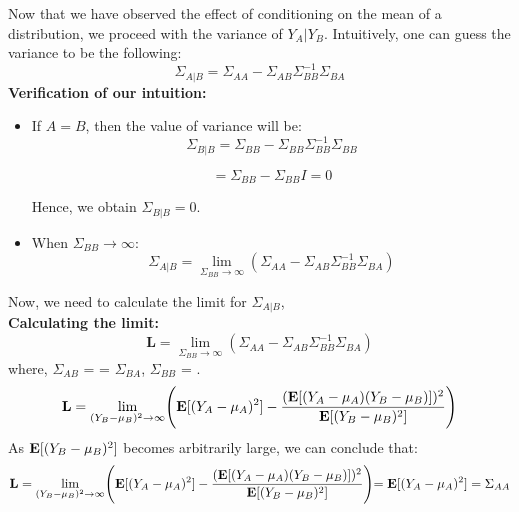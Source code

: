\documentclass[12pt]{article}
\begin{document}
\noindent
Now that we have observed the effect of conditioning on the mean of a distribution, we proceed with the variance of $Y_A|Y_B$. Intuitively, one can guess the variance to be the following:
\begin{equation}
    \Sigma_{A|B}= \Sigma_{AA}-\Sigma_{AB}\Sigma_{BB}^{-1}\Sigma_{BA}
\end{equation}
\textbf{Verification of our intuition:}

\begin{itemize}
    \item If $A=B$, then the value of variance will be: \\
    \begin{equation}
       \Sigma_{B|B} = \Sigma_{BB}-\Sigma_{BB}\Sigma_{BB}^{-1}\Sigma_{BB}    
    \end{equation}
    
    \begin{equation}
        = \Sigma_{BB}-\Sigma_{BB}I = 0
    \end{equation}
    
    Hence, we obtain  $\Sigma_{B|B} = 0$.
    
    \item When $\Sigma_{BB}\rightarrow \infty$:
    \begin{equation}
        \Sigma_{A|B}= \lim_{\Sigma_{BB}\rightarrow \infty} (\Sigma_{AA}-\Sigma_{AB}\Sigma_{BB}^{-1}\Sigma_{BA})
    \end{equation}
    \end{itemize}
    \noindent
    Now, we need to calculate the limit for $\Sigma_{A|B}$,  \\
    \textbf{Calculating the limit:}
    \begin{equation}
        \textbf{L} = \lim_{\Sigma_{BB}\rightarrow \infty}(\Sigma_{AA}-\Sigma_{AB}\Sigma_{BB}^{-1}\Sigma_{BA})
    \end{equation}
    \noindent
    where,
    $\Sigma_{AB}$ = \E[$(Y_A-\mu_A)(Y_B-\mu_B)$]= $\Sigma_{BA}$,  $\Sigma_{BB}$ = \E[$(Y_B-\mu_B)^2$].\\
    \begin{equation}
      \textbf{L} = \lim_{(Y_{B}-\mu_{B})^2\rightarrow \infty}\Biggl({\bf E}[(Y_A-\mu_A)^2]-\frac{({\bf E}[(Y_A-\mu_A)(Y_B-\mu_B)])^2}{{\bf E}[(Y_B-\mu_B)^2]}\Biggl)
    \end{equation}
    \noindent
    As ${\bf E}[(Y_B-\mu_B)^2]$ becomes arbitrarily large, we can conclude that:
\begin{equation}
    \textbf{L} = \lim_{(Y_{B}-\mu_{B})^2\rightarrow \infty}\Biggl({\bf E}[(Y_A-\mu_A)^2]-\frac{({\bf E}[(Y_A-\mu_A)(Y_B-\mu_B)])^2}{{\bf E}[(Y_B-\mu_B)^2]}\Biggl)={\bf E}[(Y_A-\mu_A)^2]=\Sigma_{AA}
\end{equation}
\end{document}
